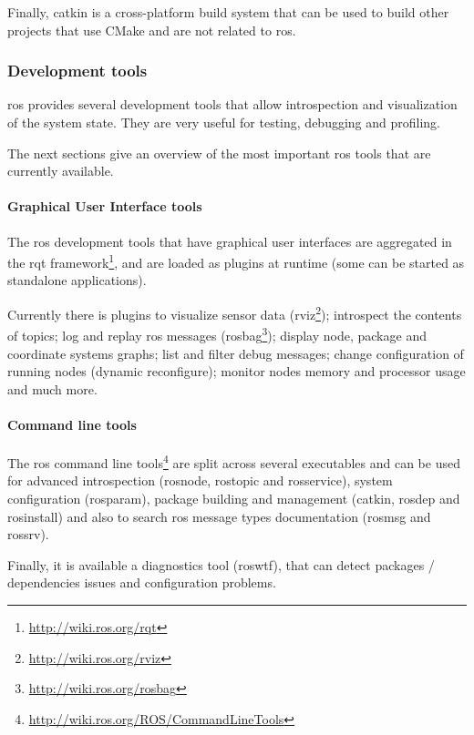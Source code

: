 Finally, catkin is a cross-platform build system that can be used to build other projects that use CMake and are not related to \gls{ros}.


\subsubsection{Development tools}

\gls{ros} provides several development tools that allow introspection and visualization of the system state. They are very useful for testing, debugging and profiling.

The next sections give an overview of the most important \gls{ros} tools that are currently available.


\paragraph{Graphical User Interface tools}

The \gls{ros} development tools that have graphical user interfaces are aggregated in the rqt framework\footnote{\url{http://wiki.ros.org/rqt}}, and are loaded as plugins at runtime (some can be started as standalone applications).

Currently there is plugins to visualize sensor data (rviz\footnote{\url{http://wiki.ros.org/rviz}}); introspect the contents of topics; log and replay \gls{ros} messages (rosbag\footnote{\url{http://wiki.ros.org/rosbag}}); display node, package and coordinate systems graphs; list and filter debug messages; change configuration of running nodes (dynamic reconfigure); monitor nodes memory and processor usage and much more.


\paragraph{Command line tools}

The \gls{ros} command line tools\footnote{\url{http://wiki.ros.org/ROS/CommandLineTools}} are split across several executables and can be used for advanced introspection (rosnode, rostopic and rosservice), system configuration (rosparam), package building and management (catkin, rosdep and rosinstall) and also to search \gls{ros} message types documentation (rosmsg and rossrv).

Finally, it is available a diagnostics tool (roswtf), that can detect packages / dependencies issues and configuration problems.



